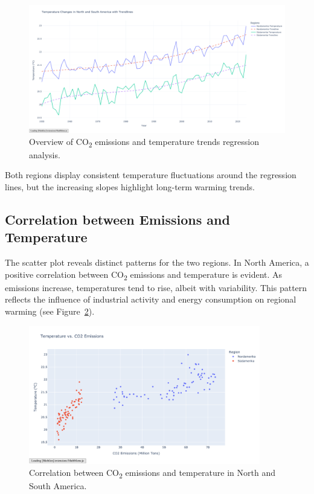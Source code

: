 \documentclass[a4paper,11pt]{article}
\begin{document}
\begin{figure}[htbp]
    \centering
    \includegraphics[width=\textwidth]{pics/temperature_trendlines.pdf} 
    \caption{Overview of CO\textsubscript{2} emissions and temperature trends regression analysis.}
    \label{fig:regression-overview}
\end{figure}

\noindent
Both regions display consistent temperature fluctuations around the regression lines, but the increasing slopes highlight long-term warming trends.

\subsection{Correlation between Emissions and Temperature}
The scatter plot reveals distinct patterns for the two regions. In North America, a positive correlation between CO\textsubscript{2} emissions and temperature is evident. As emissions increase, temperatures tend to rise, albeit with variability. This pattern reflects the influence of industrial activity and energy consumption on regional warming (see Figure~\ref{fig:corr}).

\begin{figure}[htbp]
    \centering
    \includegraphics[width=0.9\textwidth]{pics/temperature_vs_emissions.pdf} 
    \caption{Correlation between CO\textsubscript{2} emissions and temperature in North and South America.}
    \label{fig:corr}
\end{figure}
\end{document}
